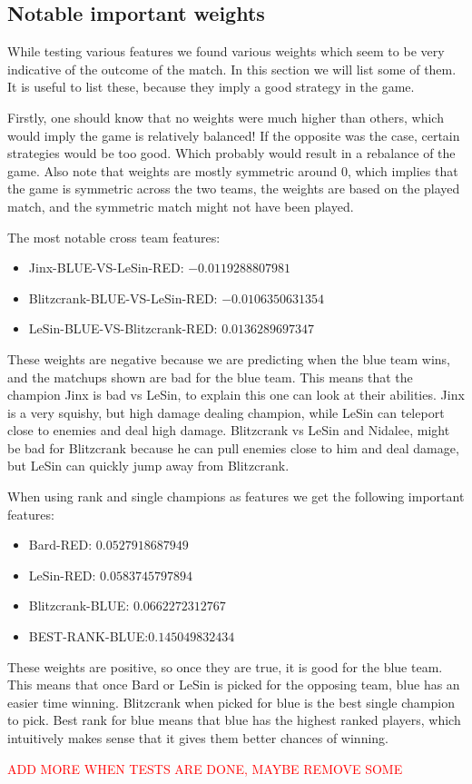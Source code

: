 \subsection{Notable important weights} %
\label{sub:important_weights}

While testing various features we found various weights which seem to be very indicative of the outcome of the match. In this section we will list some of them. It is useful to list these, because they imply a good strategy in the game.

Firstly, one should know that no weights were much higher than others, which would imply the game is relatively balanced! If the opposite was the case, certain strategies would be too good. Which probably would result in a rebalance of the game. Also note that weights are mostly symmetric around 0, which implies that the game is symmetric across the two teams, the weights are based on the played match, and the symmetric match might not have been played.

The most notable cross team features:
\begin{itemize}
    \item Jinx-BLUE-VS-LeSin-RED: $-0.0119288807981$
    \item Blitzcrank-BLUE-VS-LeSin-RED: $-0.0106350631354$
    \item LeSin-BLUE-VS-Blitzcrank-RED: $0.0136289697347$
\end{itemize}
These weights are negative because we are predicting when the blue team wins, and the matchups shown are bad for the blue team. This means that the champion Jinx is bad vs LeSin, to explain this one can look at their abilities. Jinx is a very squishy, but high damage dealing champion, while LeSin can teleport close to enemies and deal high damage. Blitzcrank vs LeSin and Nidalee, might be bad for Blitzcrank because he can pull enemies close to him and deal damage, but LeSin can quickly jump away from Blitzcrank.

When using rank and single champions as features we get the following important features:

\begin{itemize}
    \item Bard-RED: $0.0527918687949$
    \item LeSin-RED: $0.0583745797894$
    \item Blitzcrank-BLUE: $0.0662272312767$
    \item BEST-RANK-BLUE:$ 0.145049832434$
\end{itemize}

These weights are positive, so once they are true, it is good for the blue team. This means that once Bard or LeSin is picked for the opposing team, blue has an easier time winning. Blitzcrank when picked for blue is the best single champion to pick. Best rank for blue means that blue has the highest ranked players, which intuitively makes sense that it gives them better chances of winning.

\textcolor{red}{ADD MORE WHEN TESTS ARE DONE, MAYBE REMOVE SOME}


